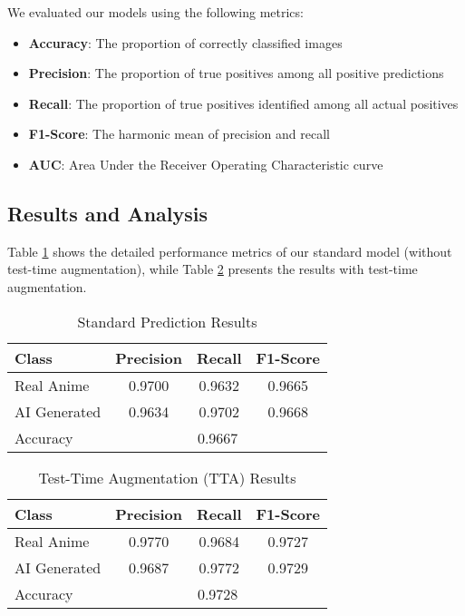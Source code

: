 \documentclass{article}
\begin{document}
We evaluated our models using the following metrics:

\begin{itemize}
    \item \textbf{Accuracy}: The proportion of correctly classified images
    \item \textbf{Precision}: The proportion of true positives among all positive predictions
    \item \textbf{Recall}: The proportion of true positives identified among all actual positives
    \item \textbf{F1-Score}: The harmonic mean of precision and recall
    \item \textbf{AUC}: Area Under the Receiver Operating Characteristic curve
\end{itemize}

\subsection{Results and Analysis}

Table \ref{tab:standard_results} shows the detailed performance metrics of our standard model (without test-time augmentation), while Table \ref{tab:tta_results} presents the results with test-time augmentation.

\begin{table}[H]
\centering
\caption{Standard Prediction Results}
\label{tab:standard_results}
\begin{tabular}{lccc}
\hline
\textbf{Class} & \textbf{Precision} & \textbf{Recall} & \textbf{F1-Score} \\
\hline
Real Anime & 0.9700 & 0.9632 & 0.9665 \\
AI Generated & 0.9634 & 0.9702 & 0.9668 \\
\hline
Accuracy & \multicolumn{3}{c}{0.9667} \\
\hline
\end{tabular}
\end{table}

\begin{table}[H]
\centering
\caption{Test-Time Augmentation (TTA) Results}
\label{tab:tta_results}
\begin{tabular}{lccc}
\hline
\textbf{Class} & \textbf{Precision} & \textbf{Recall} & \textbf{F1-Score} \\
\hline
Real Anime & 0.9770 & 0.9684 & 0.9727 \\
AI Generated & 0.9687 & 0.9772 & 0.9729 \\
\hline
Accuracy & \multicolumn{3}{c}{0.9728} \\
\hline
\end{tabular}
\end{table}
\end{document}
